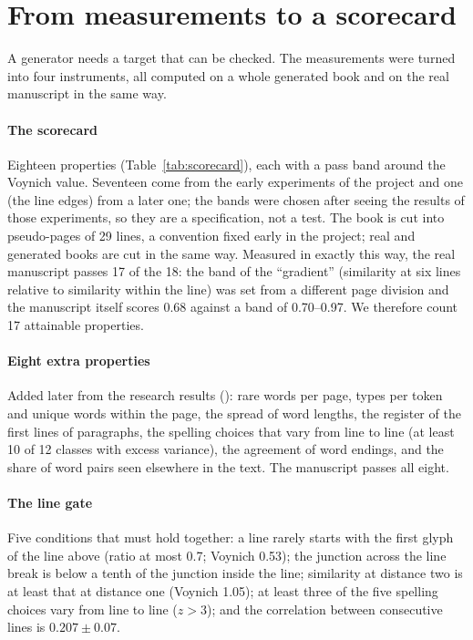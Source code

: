 \section{From measurements to a scorecard}
\label{sec:scorecard}

A generator needs a target that can be checked. The measurements were turned into four instruments, all computed on a
whole generated book and on the real manuscript in the same way.

\paragraph{The scorecard} Eighteen properties (Table~\ref{tab:scorecard}), each with a pass band around the Voynich
value. Seventeen come from the early experiments of the project and one (the line edges) from a later one; the bands were
chosen after seeing the results of those experiments, so they are a specification, not a test. The book is cut into
pseudo-pages of 29 lines, a convention fixed early in the project; real and generated books are cut in the same way. Measured in exactly this way, the real manuscript passes 17 of the 18: the band of the
``gradient'' (similarity at six lines relative to similarity within the line) was set from a different page division and
the manuscript itself scores 0.68 against a band of 0.70--0.97. We therefore count 17 attainable properties.

\paragraph{Eight extra properties} Added later from the research results (): rare words per page,
types per token and unique words within the page, the spread of word lengths, the register of the first lines of
paragraphs, the spelling choices that vary from line to line (at least 10 of 12 classes with excess variance), the
agreement of word endings, and the share of word pairs seen elsewhere in the text. The manuscript passes all eight.

\paragraph{The line gate} Five conditions that must hold together: a line rarely starts with the first glyph of the line
above (ratio at most 0.7; Voynich 0.53); the junction across the line break is below a tenth of the junction inside the
line; similarity at distance two is at least that at distance one (Voynich 1.05); at least three of the five spelling
choices vary from line to line ($z > 3$); and the correlation between consecutive lines is $0.207 \pm 0.07$.

